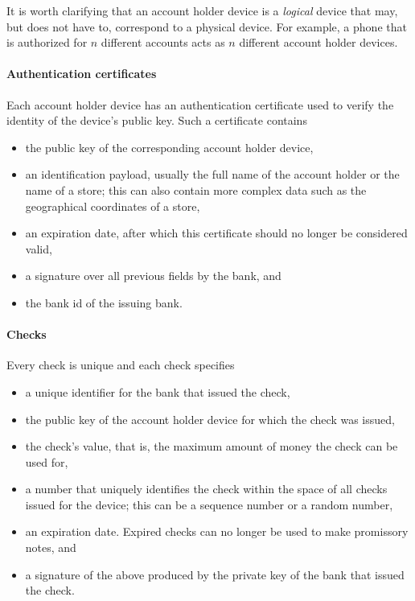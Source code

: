 \documentclass[12pt,a4paper]{article}
\begin{document}
\begin{multicols}{2}
	It is worth clarifying that an account holder device is a \emph{logical} device that may, but does not have to, correspond to a physical device. For example, a phone that is authorized for $n$ different accounts acts as $n$ different account holder devices.

	\paragraph{Authentication certificates}
	
	Each account holder device has an authentication certificate used to verify the identity of the device's public key. Such a certificate contains
	\begin{itemize}
		\item the public key of the corresponding account holder device,
		\item an identification payload, usually the full name of the account holder or the name of a store; this can also contain more complex data such as the geographical coordinates of a store,
		\item an expiration date, after which this certificate should no longer be considered valid,
		\item a signature over all previous fields by the bank, and
		\item the bank id of the issuing bank.
	\end{itemize}

	\paragraph{Checks}
	
	Every check is unique and each check specifies
	
	\begin{itemize}
		\item a unique identifier for the bank that issued the check,
		\item the public key of the account holder device for which the check was issued,
		\item the check's value, that is, the maximum amount of money the check can be used for,
		\item a number that uniquely identifies the check within the space of all checks issued for the device; this can be a sequence number or a random number,
		\item an expiration date. Expired checks can no longer be used to make promissory notes, and
		\item a signature of the above produced by the private key of the bank that issued the check.
	\end{itemize}


\end{multicols}
\end{document}
